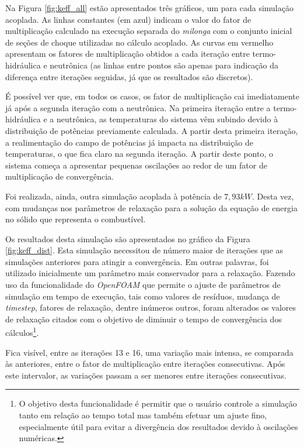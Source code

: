 Na Figura \ref{fig:keff_all} estão apresentados três gráficos, um para cada simulação
acoplada. As linhas constantes (em azul) indicam o valor do fator de multiplicação
calculado na execução separada do \textit{milonga} com o conjunto inicial de seções
de choque utilizadas no cálculo acoplado. As curvas em vermelho apresentam os fatores
de multiplicação obtidos a cada iteração entre termo-hidráulica e neutrônica (as linhas
entre pontos são apenas para indicação da diferença entre iterações seguidas, já
que os resultados são discretos).

É possível ver que, em todos os casos, os fator de multiplicação cai imediatamente
já após a segunda iteração com a neutrônica. Na primeira iteração entre a
termo-hidráulica e a neutrônica, as temperaturas do sistema vêm subindo devido
à distribuição de potências previamente calculada. A partir desta primeira iteração,
a realimentação do campo de potências já impacta na distribuição de temperaturas,
o que fica claro na segunda iteração. A partir deste ponto, o sistema começa a
apresentar pequenas oscilações ao redor de um fator de multiplicação de convergência.

%
%
%

Foi realizada, ainda, outra simulação acoplada à potência de $7,93 kW$.
Desta vez, com mudanças nos parâmetros de relaxação para a solução
da equação de energia no sólido que representa o combustível.

Os resultados desta simulação são apresentados no gráfico da Figura \ref{fig:keff_dist}.
Esta simulação necessitou de número maior de iterações que as simulações anteriores para
atingir a convergência. Em outras palavras, foi utilizado inicialmente um parâmetro
mais conservador para a relaxação. Fazendo uso da funcionalidade do \textit{OpenFOAM}
que permite o ajuste de parâmetros de simulação em tempo de execução, tais como
valores de resíduos, mudança de \textit{timestep}, fatores de relaxação, dentre
inúmeros outros, foram alterados os valores de relaxação citados com o objetivo
de diminuir o tempo de convergência dos cálculos\footnote{O objetivo desta funcionalidade é permitir que o
usuário controle a simulação tanto em relação ao tempo total mas também
efetuar um ajuste fino, especialmente útil para evitar a divergência dos
resultados devido à oscilações numéricas.}.

Fica visível, entre as iterações 13 e 16, uma variação mais intensa, se comparada
às anteriores, entre o fator de multiplicação entre iterações consecutivas. Após
este intervalor, as variações passam a ser menores entre iterações consecutivas.


